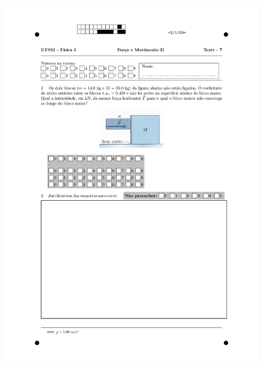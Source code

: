 \begin{figure}[H]\centering
\includegraphics[scale=0.7]{fig/orp1q6_page-0002.jpg}
\end{figure}
\vspace*{\fill}
